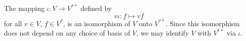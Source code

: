 The mapping $\iota: V \rightarrow V^{**}$ defined by
$$
v\iota: f \mapsto vf
$$
for all $v \in V$, $f \in V^*$, is an isomorphism of $V$ onto $V^{**}$. Since this isomorphism does not depend on any choice of basis of $V$, we may identify $V$ with $V^{**}$ via $\iota$.
